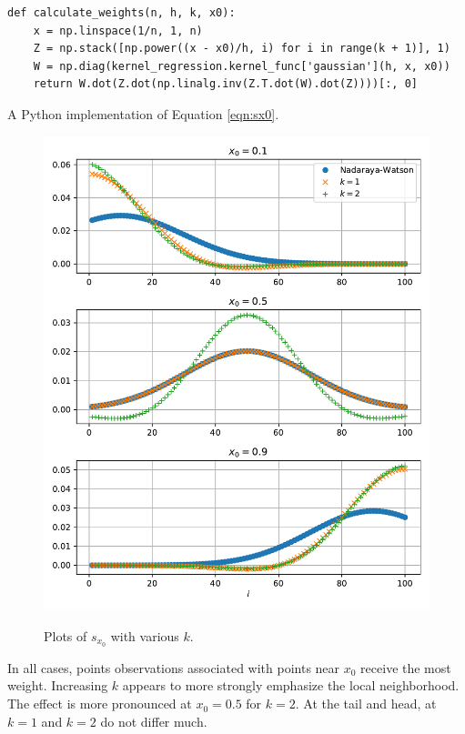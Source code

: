 \documentclass[letterpaper]{article}
\begin{document}
\begin{enumerate}[(a)]
\begin{listing}
\begin{verbatim}
def calculate_weights(n, h, k, x0):
    x = np.linspace(1/n, 1, n)
    Z = np.stack([np.power((x - x0)/h, i) for i in range(k + 1)], 1)
    W = np.diag(kernel_regression.kernel_func['gaussian'](h, x, x0))
    return W.dot(Z.dot(np.linalg.inv(Z.T.dot(W).dot(Z))))[:, 0]
  \end{verbatim}
    \caption{A Python implementation of Equation \ref{eqn:sx0}.}
    \label{lst:sx0}
  \end{listing}

  \begin{figure}
    \caption{Plots of $s_{x_0}$ with various $k$.}
    \centering
    \includegraphics{loess.pdf}
    \label{fig:loess}
  \end{figure}

  In all cases, points observations associated with points near $x_0$ receive
  the most weight. Increasing $k$ appears to more strongly emphasize the local
  neighborhood. The effect is more pronounced at $x_0 = 0.5$ for $k=2$. At the
  tail and head, at $k = 1$ and $k = 2$ do not differ much.
\end{enumerate}
\end{document}
